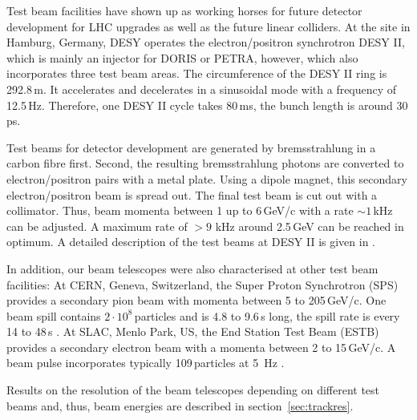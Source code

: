 Test beam facilities have shown up as working horses for future detector development for LHC upgrades as well as the future linear colliders.
At the site in Hamburg, Germany, DESY operates the electron/positron synchrotron DESY II, which is mainly an injector for DORIS or PETRA, however, which also incorporates three test beam areas. 
The circumference of the DESY II ring is 292.8\,m. 
It accelerates and decelerates in a sinusoidal mode with a frequency of 12.5\,Hz. 
Therefore, one DESY II cycle takes 80\,ms, the bunch length is around 30\,ps. 

Test beams for detector development are generated by bremsstrahlung in a carbon fibre first. 
Second, the resulting bremsstrahlung photons are converted to electron/positron pairs with a metal plate. 
Using a dipole magnet, this secondary electron/positron beam is spread out.
The final test beam is cut out with a collimator. 
Thus, beam momenta between 1 up to 6\,GeV/c with a rate $\sim 1$\,kHz can be adjusted. A maximum rate of $> 9$ kHz around 2.5\,GeV can be reached in optimum. A detailed description of the test beams at DESY II is given in \cite{EUDET-2007-11}.

In addition, our beam telescopes were also characterised at other test beam facilities: 
At CERN, Geneva, Switzerland, the Super Proton Synchrotron (SPS) provides a secondary pion beam with momenta between 5 to 205\,GeV/c. 
One beam spill contains $2\cdot10^8$\,particles and is 4.8 to 9.6\,s long, the spill rate is every 14 to 48\,s \cite{???}.  
At SLAC, Menlo Park, US, the End Station Test Beam (ESTB) provides a secondary electron beam with a momenta between 2 to 15\,GeV/c.
A beam pulse incorporates typically 109\,particles at 5~Hz \cite{d}.

Results on the resolution of the beam telescopes depending on different test beams and, thus, beam energies are described in section~\ref{sec:trackres}. 





